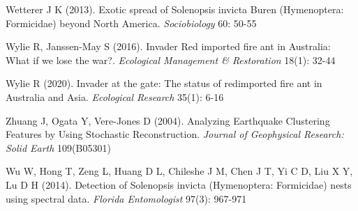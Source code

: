 \documentclass[11pt,a4paper]{article}
\begin{document}
\begin{thebibliography}{99}
 Wetterer J K (2013). Exotic spread of Solenopsis invicta Buren (Hymenoptera: Formicidae) beyond North America. \textit{Sociobiology} 60: 50-55

 Wylie R, Janssen-May S (2016). Invader  Red imported fire ant in Australia:  What if we lose the war?. \textit{Ecological Management & Restoration} 18(1): 32-44

 Wylie R (2020). Invader at the gate: The status of redimported fire ant in Australia and Asia. \textit{Ecological Research} 35(1): 6-16

 Zhuang J, Ogata Y, Vere-Jones D (2004). Analyzing Earthquake Clustering Features by Using Stochastic Reconstruction. \textit{Journal of Geophysical Research: Solid Earth} 109(B05301)

 Wu W, Hong T, Zeng L, Huang D L, Chileshe J M, Chen J T, Yi C D, Liu X Y, Lu D H (2014). Detection of Solenopsis invicta (Hymenoptera: Formicidae) nests using spectral data. \textit{Florida Entomologist} 97(3): 967-971

\end{thebibliography}
\end{document}
